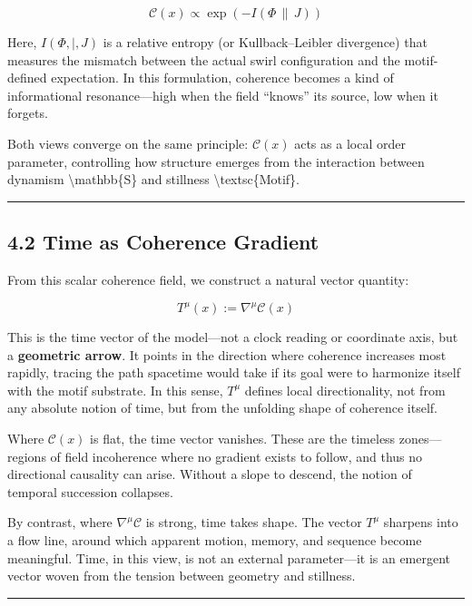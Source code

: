 \documentclass[
  11pt,
]{article}
\begin{document}
\[
\mathcal{C}(x) \propto \exp\left( -I(\Phi \,\|\, J) \right)
\]

Here, \(I(\Phi ,|, J)\) is a relative entropy (or Kullback--Leibler
divergence) that measures the mismatch between the actual swirl
configuration and the motif-defined expectation. In this formulation,
coherence becomes a kind of informational resonance---high when the
field ``knows'' its source, low when it forgets.

Both views converge on the same principle: \(\mathcal{C}(x)\) acts as a
local order parameter, controlling how structure emerges from the
interaction between dynamism \textbackslash mathbb\{S\} and stillness
\textbackslash textsc\{Motif\}.

\begin{center}\rule{0.5\linewidth}{0.5pt}\end{center}

\subsection{4.2 Time as Coherence
Gradient}\label{time-as-coherence-gradient}

From this scalar coherence field, we construct a natural vector
quantity:

\[
T^\mu(x) := \nabla^\mu \mathcal{C}(x)
\]

This is the time vector of the model---not a clock reading or coordinate
axis, but a \textbf{geometric arrow}. It points in the direction where
coherence increases most rapidly, tracing the path spacetime would take
if its goal were to harmonize itself with the motif substrate. In this
sense, \(T^\mu\) defines local directionality, not from any absolute
notion of time, but from the unfolding shape of coherence itself.

Where \(\mathcal{C}(x)\) is flat, the time vector vanishes. These are
the timeless zones---regions of field incoherence where no gradient
exists to follow, and thus no directional causality can arise. Without a
slope to descend, the notion of temporal succession collapses.

By contrast, where \(\nabla^\mu \mathcal{C}\) is strong, time takes
shape. The vector \(T^\mu\) sharpens into a flow line, around which
apparent motion, memory, and sequence become meaningful. Time, in this
view, is not an external parameter---it is an emergent vector woven from
the tension between geometry and stillness.

\begin{center}\rule{0.5\linewidth}{0.5pt}\end{center}
\end{document}
